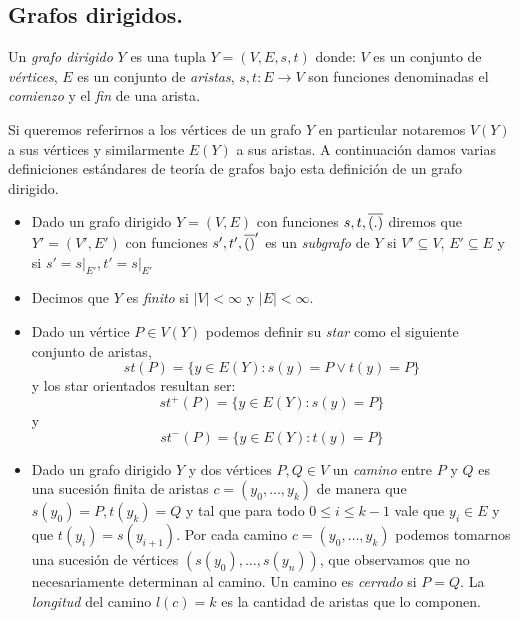 \documentclass[tesis.tex]{subfiles}
\begin{document}
\begin{leoenv}

\subsection{Grafos dirigidos.}

\begin{deff}
	Un \emph{grafo dirigido} $Y$ es una tupla $Y = (V,E,s,t)$ donde: 
	$V$ es un conjunto de \emph{vértices}, 
	$E$ es un conjunto de \emph{aristas},
	$s,t:E \to V$ son funciones denominadas el \emph{comienzo} y el \emph{fin} de una arista.

	Si queremos referirnos a los vértices de un grafo $Y$ en particular notaremos $V(Y)$ a sus vértices y similarmente $E(Y)$ a sus aristas.
	A continuación damos varias definiciones estándares de teoría de grafos bajo esta definición de un grafo dirigido.
	\begin{itemize}

		\item Dado un grafo dirigido $Y=(V,E)$ con funciones $s,t, \overline{(.)}$ diremos que $Y'=(V',E')$ con funciones $s',t',\overline{()}'$ es un \emph{subgrafo} de $Y$ si $V' \subseteq V$, $E' \subseteq E$ y si $s'=\left. s \right|_{E'}, t' = \left. s \right|_{E'}$ 
		
		\item Decimos que $Y$ es \emph{finito} si $|V| < \infty$ y $|E| < \infty$.	
		
		\item Dado un vértice $P \in V(Y)$ podemos definir su \emph{star} como el siguiente conjunto de aristas,
		\[
		st(P) = \{  y \in E(Y) : s(y) = P \lor t(y) = P \}
		\]
		y los star orientados resultan ser:
		\[
			st^{+}(P) = \{  y \in E(Y) : s(y) = P \}
		\]
		y 
		\[
			st^{-}(P) = \{  y \in E(Y) : t(y) = P \}
		\]
		
		\item Dado un grafo dirigido $Y$ y dos vértices $P, Q \in V$ un \emph{camino}  entre $P$ y $Q$ es una sucesión finita de aristas $c = (y_0, \dots, y_k)$ de manera que $s(y_0) = P, t(y_k) = Q$ y tal que para todo $0 \le i \le k-1$ vale que $y_i \in E$ y que $t(y_i) = s(y_{i+1})$.
		Por cada camino $c = (y_0, \dots, y_k)$ podemos tomarnos una sucesión de vértices $(s(y_{0}), \dots, s(y_{n}))$, que observamos que no necesariamente determinan al camino.
		Un camino es \emph{cerrado} si $P = Q$.
		La \emph{longitud} del camino $l(c) = k$ es la cantidad de aristas que lo componen.
		

\end{itemize}
\end{deff}
\end{leoenv}
\end{document}
